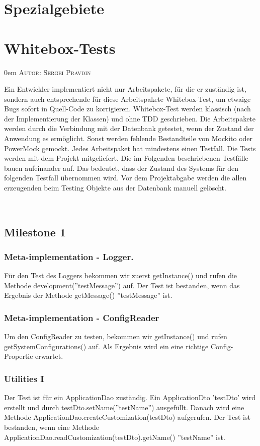 \documentclass{article}
\makeatletter
\newcommand{\sectionauthor}[1]{
	{\parindent 0em \large \scshape Autor: #1 \par \nobreak \vspace*{1em}}
	\@afterheading
}
\makeatother
\begin{document}
\section{Spezialgebiete}

\newpage
\section{Whitebox-Tests}
\sectionauthor{Sergei Pravdin}
Ein Entwickler implementiert nicht nur Arbeitspakete, für die er zuständig ist, sondern auch entsprechende für diese Arbeitspakete Whitebox-Test, um etwaige Bugs sofort in Quell-Code zu korrigieren. Whitebox-Test werden klassisch (nach der Implementierung der Klassen) und ohne TDD geschrieben. Die Arbeitspakete werden durch die Verbindung mit der Datenbank getestet, wenn der Zustand der Anwendung es ermöglicht. Sonst werden fehlende Bestandteile von Mockito oder PowerMock gemockt. Jedes Arbeitspaket hat mindestens einen Testfall. Die Tests werden mit dem Projekt mitgeliefert. Die im Folgenden beschriebenen Testfälle bauen aufeinander auf. Das bedeutet, dass der Zustand des Systems für den folgenden Testfall übernommen wird. Vor dem Projektabgabe werden die allen erzeugenden beim Testing Objekte aus der Datenbank manuell gelöscht. 

­\subsection{Milestone 1}

\subsubsection{Meta-implementation - Logger.}
Für den Test des Loggers bekommen wir zuerst getInstance() und rufen die Methode development(''testMessage'') auf. Der Test ist bestanden, wenn das Ergebnis der Methode getMessage() ''testMessage'' ist.

\subsubsection{Meta-implementation - ConfigReader}
Um den ConfigReader zu testen, bekommen wir getInstance() und rufen getSystemConfigurations() auf. Als Ergebnis wird ein eine richtige Config-Propertie erwartet.

\subsubsection{Utilities I}
Der Test ist für ein ApplicationDao zuständig. Ein ApplicationDto 'testDto' wird erstellt und durch testDto.setName(''testName'') ausgefüllt. Danach wird eine Methode \linebreak ApplicationDao.createCustomization(testDto) aufgerufen. Der Test ist bestanden, wenn eine Methode ApplicationDao.readCustomization(testDto).getName() ''testName'' ist.
\end{document}
